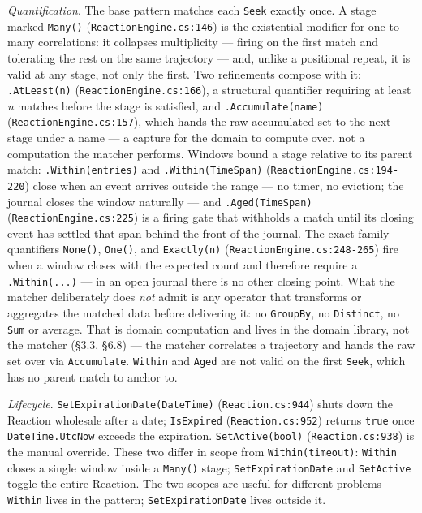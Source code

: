 \documentclass[
]{article}
\let\origtexttt\texttt%
\renewcommand{\texttt}[1]{\origtexttt{\seqsplit{#1}}}%
\let\texttt\origtexttt%
\begin{document}
\emph{Quantification}. The base pattern matches each \texttt{Seek}
exactly once. A stage marked \texttt{Many()}
(\texttt{ReactionEngine.cs:146}) is the existential modifier for
one-to-many correlations: it collapses multiplicity --- firing on the
first match and tolerating the rest on the same trajectory --- and,
unlike a positional repeat, it is valid at any stage, not only the
first. Two refinements compose with it: \texttt{.AtLeast(n)}
(\texttt{ReactionEngine.cs:166}), a structural quantifier requiring at
least \emph{n} matches before the stage is satisfied, and
\texttt{.Accumulate(name)} (\texttt{ReactionEngine.cs:157}), which hands
the raw accumulated set to the next stage under a name --- a capture for
the domain to compute over, not a computation the matcher performs.
Windows bound a stage relative to its parent match:
\texttt{.Within(entries)} and \texttt{.Within(TimeSpan)}
(\texttt{ReactionEngine.cs:194-220}) close when an event arrives outside
the range --- no timer, no eviction; the journal closes the window
naturally --- and \texttt{.Aged(TimeSpan)}
(\texttt{ReactionEngine.cs:225}) is a firing gate that withholds a match
until its closing event has settled that span behind the front of the
journal. The exact-family quantifiers \texttt{None()}, \texttt{One()},
and \texttt{Exactly(n)} (\texttt{ReactionEngine.cs:248-265}) fire when a
window closes with the expected count and therefore require a
\texttt{.Within(...)} --- in an open journal there is no other closing
point. What the matcher deliberately does \emph{not} admit is any
operator that transforms or aggregates the matched data before
delivering it: no \texttt{GroupBy}, no \texttt{Distinct}, no
\texttt{Sum} or average. That is domain computation and lives in the
domain library, not the matcher (§3.3, §6.8) --- the matcher correlates
a trajectory and hands the raw set over via \texttt{Accumulate}.
\texttt{Within} and \texttt{Aged} are not valid on the first
\texttt{Seek}, which has no parent match to anchor to.

\emph{Lifecycle}. \texttt{SetExpirationDate(DateTime)}
(\texttt{Reaction.cs:944}) shuts down the Reaction wholesale after a
date; \texttt{IsExpired} (\texttt{Reaction.cs:952}) returns
\texttt{true} once \texttt{DateTime.UtcNow} exceeds the expiration.
\texttt{SetActive(bool)} (\texttt{Reaction.cs:938}) is the manual
override. These two differ in scope from \texttt{Within(timeout)}:
\texttt{Within} closes a single window inside a \texttt{Many()} stage;
\texttt{SetExpirationDate} and \texttt{SetActive} toggle the entire
Reaction. The two scopes are useful for different problems ---
\texttt{Within} lives in the pattern; \texttt{SetExpirationDate} lives
outside it.
\end{document}
